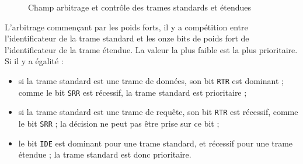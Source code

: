 \begin{figure}[ht]
  \centering
  \caption{Champ arbitrage et contrôle des trames standards et étendues}
\end{figure}

L'arbitrage commençant par les poids forts, il y a compétition entre l'identificateur de la trame standard et les onze bits de poids fort de l'identificateur de la trame étendue. La valeur la plus faible est la plus prioritaire. Si il y a égalité :
\begin{itemize}
  \item si la trame standard est une trame de données, son bit \texttt{RTR} est dominant ; comme le bit \texttt{SRR} est récessif, la trame standard est prioritaire ;
  \item si la trame standard est une trame de requête, son bit \texttt{RTR} est récessif, comme le bit \texttt{SRR} ; la décision ne peut pas être prise sur ce bit ;
  \item le bit \texttt{IDE} est dominant pour une trame standard, et récessif pour une trame étendue ; la trame standard est donc prioritaire.
\end{itemize}

